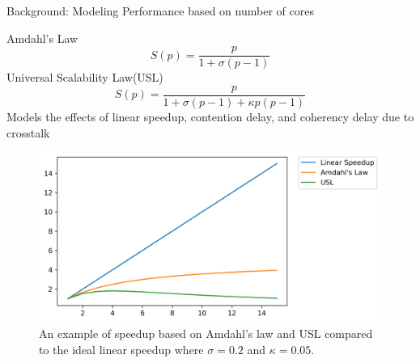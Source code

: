 \documentclass[10pt]{beamer}
\begin{document}
\begin{frame}{Background: Modeling Performance based on number of cores}
	\begin{outline}
		\1Amdahl's Law
			$$S(p) = \frac{p}{1+\sigma(p-1)}$$
		\1Universal Scalability Law(USL)
		$$S(p) = \frac{p}{1+\sigma(p-1)+\kappa{p}(p-1)}$$
		\2 Models the effects
		of linear speedup, contention delay, and coherency delay due to crosstalk
		\begin{figure}[H]
			\centering
			\includegraphics[scale=0.38]{images/USL.png}
			\caption{An example of speedup based on Amdahl's law and USL compared to the ideal linear speedup where $\sigma=0.2$ and $\kappa=0.05$.}	
			\label{fig_Amdahl}
		\end{figure}
		

	\end{outline}
\end{frame}




\end{document}
